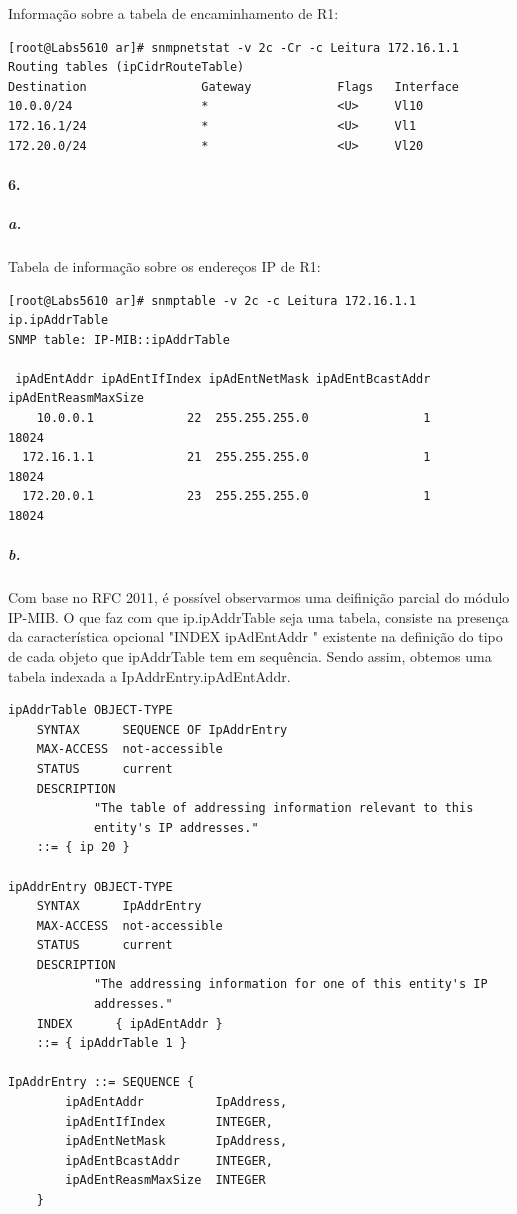\newpage

Informação sobre a tabela de encaminhamento de \textsf{R1}:
\begin{verbatim}
[root@Labs5610 ar]# snmpnetstat -v 2c -Cr -c Leitura 172.16.1.1
Routing tables (ipCidrRouteTable)
Destination                Gateway            Flags   Interface
10.0.0/24                  *                  <U>     Vl10
172.16.1/24                *                  <U>     Vl1
172.20.0/24                *                  <U>     Vl20
\end{verbatim}


\paragraph{6.}

\subparagraph{a.}
Tabela de informação sobre os endereços IP de \textsf{R1}:
\begin{verbatim}
[root@Labs5610 ar]# snmptable -v 2c -c Leitura 172.16.1.1 ip.ipAddrTable
SNMP table: IP-MIB::ipAddrTable

 ipAdEntAddr ipAdEntIfIndex ipAdEntNetMask ipAdEntBcastAddr ipAdEntReasmMaxSize
    10.0.0.1             22  255.255.255.0                1               18024
  172.16.1.1             21  255.255.255.0                1               18024
  172.20.0.1             23  255.255.255.0                1               18024

\end{verbatim}


\subparagraph{b.}
Com base no RFC 2011, é possível observarmos uma deifinição parcial do módulo IP-MIB. O que faz com que ip.ipAddrTable seja uma tabela, consiste na presença da característica opcional "INDEX { ipAdEntAddr }" existente na definição do tipo de cada objeto que ipAddrTable tem em sequência. Sendo assim, obtemos uma tabela indexada a IpAddrEntry.ipAdEntAddr.

\begin{verbatim}
ipAddrTable OBJECT-TYPE
    SYNTAX      SEQUENCE OF IpAddrEntry
    MAX-ACCESS  not-accessible
    STATUS      current
    DESCRIPTION
            "The table of addressing information relevant to this
            entity's IP addresses."
    ::= { ip 20 }

ipAddrEntry OBJECT-TYPE
    SYNTAX      IpAddrEntry
    MAX-ACCESS  not-accessible
    STATUS      current
    DESCRIPTION
            "The addressing information for one of this entity's IP
            addresses."
    INDEX      { ipAdEntAddr }
    ::= { ipAddrTable 1 }

IpAddrEntry ::= SEQUENCE {
        ipAdEntAddr          IpAddress,
        ipAdEntIfIndex       INTEGER,
        ipAdEntNetMask       IpAddress,
        ipAdEntBcastAddr     INTEGER,
        ipAdEntReasmMaxSize  INTEGER
    }    
\end{verbatim}


